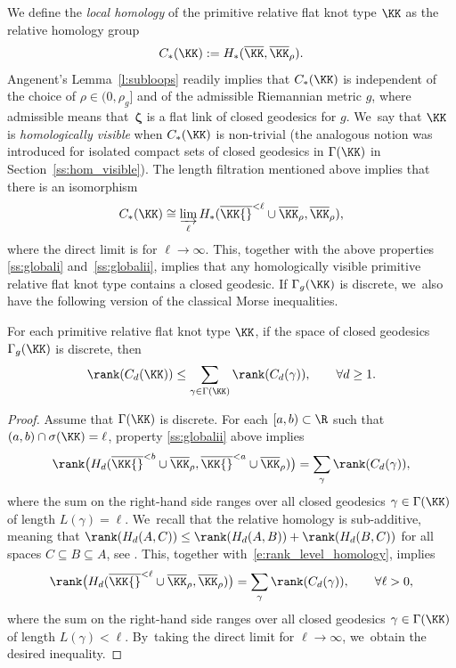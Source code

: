 We define the \emph{local homology} of the primitive relative flat knot type $\KK$ as the relative homology group
\begin{align*}
C_*(\KK):=H_*(\overline\KK,\overline\KK_\rho).
\end{align*}
Angenent's Lemma~\ref{l:subloops} readily implies that $C_*(\KK)$ is independent of the choice of $\rho\in(0,\rho_g]$ and of the admissible Riemannian metric $g$, where admissible means that~$\bm\zeta$ is a flat link of closed geodesics for $g$. We~say that $\KK$ is \emph{homologically visible} when $C_*(\KK)$ is non-trivial (the analogous notion was introduced for isolated compact sets of closed geodesics in $\Gamma(\KK)$ in Section~\ref{ss:hom_visible}).
The length filtration mentioned above implies that there is an isomorphism
\begin{align*}
C_*(\KK)
\cong
\varinjlim_\ell H_*(\overline\KK{}^{<\ell}\cup\overline\KK_\rho,\overline\KK_\rho),
\end{align*}
where the direct limit is for $\ell\to\infty$.
This, together with the above properties \eqref{ss:globali} and~\eqref{ss:globalii}, implies that any homologically visible primitive relative flat knot type contains a closed geodesic. If $\Gamma_g(\KK)$ is discrete, we~also have the following version of the classical Morse inequalities.

\begin{Prop}\label{p:Morse_inequality}
For each primitive relative flat knot type $\KK$, if the space of closed geodesics $\Gamma_g(\KK)$ is discrete, then
\begin{align*}
\rank(C_d(\KK)) \leq \sum_{\gamma\in\Gamma(\KK)} \rank(C_d(\gamma)),\qquad
\forall d\geq 1.
\end{align*}
\end{Prop}

\begin{proof}
Assume that $\Gamma(\KK)$ is discrete.
For each $[a,b)\subset\R$ such that $(a,b)\cap\sigma(\KK)=\ell$, property \eqref{ss:globalii} above implies
\begin{align}
\label{e:rank_level_homology}
\rank\big(H_d(\overline\KK{}^{<b}\cup\overline\KK_\rho,\overline\KK{}^{<a}\cup\overline\KK_\rho)\big)
=
\sum_{\gamma}
\rank(C_d(\gamma)),
\end{align}
where the sum on the right-hand side ranges over all closed geodesics $\gamma\in\Gamma(\KK)$ of length $L(\gamma)=\ell$. We~recall that the relative homology is sub-additive, meaning that $\rank(H_d(A,C))\leq\rank(H_d(A,B))+\rank(H_d(B,C))$ for all spaces $C\subseteq B\subseteq A$, see \cite[\S 5]{Milnor:1963aa}. This, together with~\eqref{e:rank_level_homology}, implies
\begin{align*}
\label{e:rank_level_homology}
\rank\big(H_d(\overline\KK{}^{<\ell}\cup\overline\KK_\rho,\overline\KK_\rho)\big)
=
\sum_{\gamma}
\rank(C_d(\gamma)),
\qquad\forall \ell>0,
\end{align*}
where the sum on the right-hand side ranges over all closed geodesics $\gamma\in\Gamma(\KK)$ of length $L(\gamma)<\ell$. By~taking the direct limit for $\ell\to\infty$, we~obtain the desired inequality.
\end{proof}

